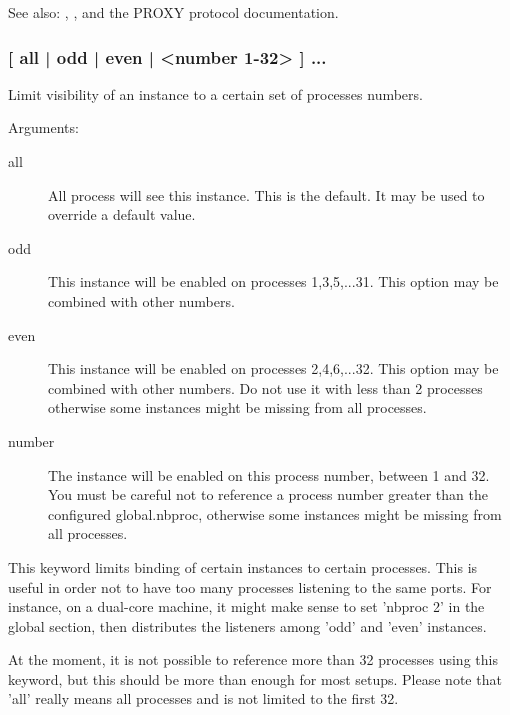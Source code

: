 See also: , ,  and the PROXY protocol
             documentation.

\subsubsection[bind-process]{ [ all | odd | even | <number 1-32> ] ...}

  Limit visibility of an instance to a certain set of processes numbers.
  
                                 
  Arguments:
  \begin{description}
  \item[all]   All process will see this instance. This is the default. It
                  may be used to override a default value.

  \item[odd]   This instance will be enabled on processes 1,3,5,...31. This
                  option may be combined with other numbers.

  \item[even]  This instance will be enabled on processes 2,4,6,...32. This
                  option may be combined with other numbers. Do not use it
                  with less than 2 processes otherwise some instances might be
                  missing from all processes.

  \item[number] The instance will be enabled on this process number, between
                  1 and 32. You must be careful not to reference a process
                  number greater than the configured global.nbproc, otherwise
                  some instances might be missing from all processes.
  \end{description}

  This keyword limits binding of certain instances to certain processes. This
  is useful in order not to have too many processes listening to the same
  ports. For instance, on a dual-core machine, it might make sense to set
  'nbproc 2' in the global section, then distributes the listeners among 'odd'
  and 'even' instances.

  At the moment, it is not possible to reference more than 32 processes using
  this keyword, but this should be more than enough for most setups. Please
  note that 'all' really means all processes and is not limited to the first
  32.

